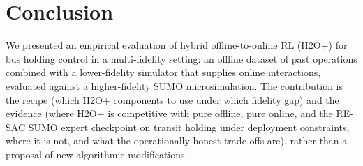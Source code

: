 \section{Conclusion}
\label{sec:conclusion}

We presented an empirical evaluation of hybrid offline-to-online RL (H2O+) for bus holding control in a multi-fidelity setting: an offline dataset of past operations combined with a lower-fidelity simulator that supplies online interactions, evaluated against a higher-fidelity SUMO microsimulation.
The contribution is the recipe (which H2O+ components to use under which fidelity gap) and the evidence (where H2O+ is competitive with pure offline, pure online, and the RE-SAC SUMO expert checkpoint on transit holding under deployment constraints, where it is not, and what the operationally honest trade-offs are), rather than a proposal of new algorithmic modifications.

